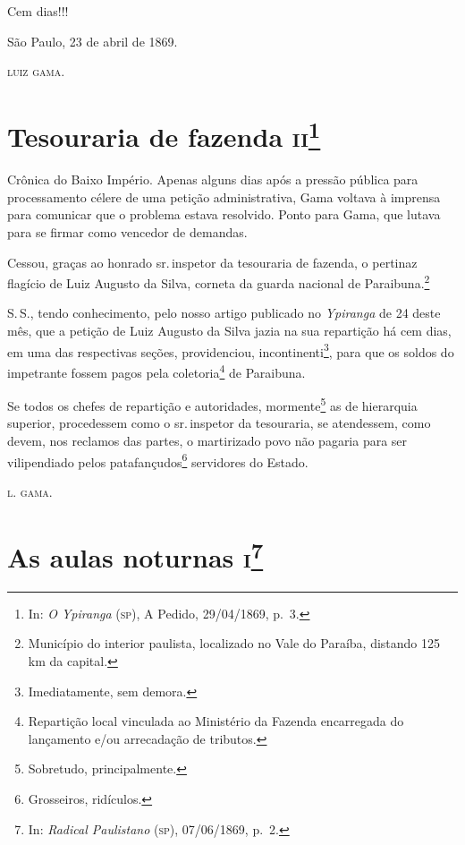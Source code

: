 Cem dias!!!
\begin{flushright}
São Paulo, 23 de abril de 1869.

\textsc{luiz gama}.
\end{flushright}

\chapter{Tesouraria de fazenda \textsc{ii}\footnote{In: \emph{O Ypiranga}
  (\textsc{sp}), A Pedido, 29/04/1869, p.~3.}}

\begin{didascalia}
Crônica do Baixo Império. Apenas alguns dias após a pressão pública para
processamento célere de uma petição administrativa, Gama voltava à
imprensa para comunicar que o problema estava resolvido. Ponto para
Gama, que lutava para se firmar como vencedor de demandas.
\end{didascalia}


Cessou, graças ao honrado sr.\,inspetor da tesouraria de fazenda, o
pertinaz flagício de Luiz Augusto da Silva, corneta da guarda nacional
de Paraibuna.\footnote{Município do interior paulista, localizado no
  Vale do Paraíba, distando 125 km da capital.}

S.\,S., tendo conhecimento, pelo nosso artigo publicado no
\emph{Ypiranga} de 24 deste mês, que a petição de Luiz Augusto da Silva
jazia na sua repartição há cem dias, em uma das respectivas seções,
providenciou, incontinenti\footnote{Imediatamente, sem demora.}, para
que os soldos do impetrante fossem pagos pela coletoria\footnote{
  Repartição local vinculada ao Ministério da Fazenda encarregada do
  lançamento e/ou arrecadação de tributos.} de Paraibuna.

Se todos os chefes de repartição e autoridades, mormente\footnote{
  Sobretudo, principalmente.} as de hierarquia superior, procedessem
como o sr.\,inspetor da tesouraria, se atendessem, como devem, nos
reclamos das partes, o martirizado povo não pagaria para ser
vilipendiado pelos patafançudos\footnote{Grosseiros, ridículos.}
servidores do Estado.
\begin{flushright}
\textsc{l. gama}.
\end{flushright}

\chapter{As aulas noturnas \textsc{i}\footnote{In: \emph{Radical Paulistano}
  (\textsc{sp}), 07/06/1869, p.~2.}}


